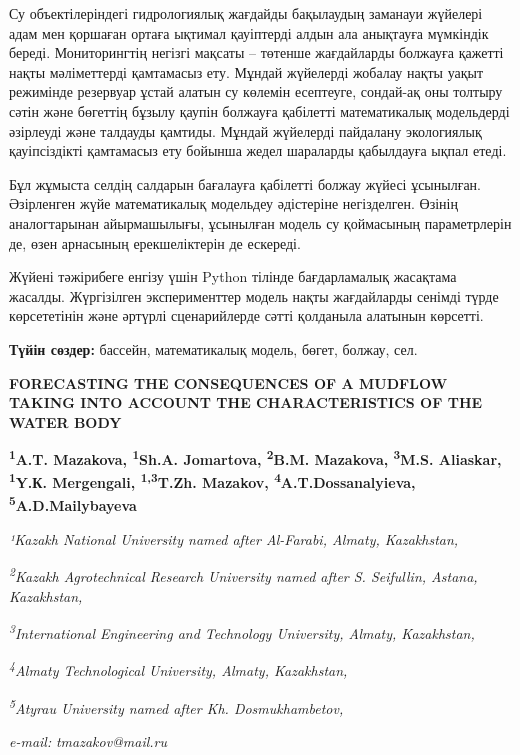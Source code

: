 Су объектілеріндегі гидрологиялық жағдайды бақылаудың заманауи жүйелері
адам мен қоршаған ортаға ықтимал қауіптерді алдын ала анықтауға
мүмкіндік береді. Мониторингтің негізгі мақсаты -- төтенше жағдайларды
болжауға қажетті нақты мәліметтерді қамтамасыз ету. Мұндай жүйелерді
жобалау нақты уақыт режимінде резервуар ұстай алатын су көлемін
есептеуге, сондай-ақ оны толтыру сәтін және бөгеттің бұзылу қаупін
болжауға қабілетті математикалық модельдерді әзірлеуді және талдауды
қамтиды. Мұндай жүйелерді пайдалану экологиялық қауіпсіздікті қамтамасыз
ету бойынша жедел шараларды қабылдауға ықпал етеді.

Бұл жұмыста селдің салдарын бағалауға қабілетті болжау жүйесі ұсынылған.
Әзірленген жүйе математикалық модельдеу әдістеріне негізделген. Өзінің
аналогтарынан айырмашылығы, ұсынылған модель су қоймасының параметрлерін
де, өзен арнасының ерекшеліктерін де ескереді.

Жүйені тәжірибеге енгізу үшін Python тілінде бағдарламалық жасақтама
жасалды. Жүргізілген эксперименттер модель нақты жағдайларды сенімді
түрде көрсететінін және әртүрлі сценарийлерде сәтті қолданыла алатынын
көрсетті.

{\bfseries Түйін сөздер:} бассейн, математикалық модель, бөгет, болжау,
сел.

\begin{articleheader}
{\bfseries FORECASTING THE CONSEQUENCES OF A MUDFLOW TAKING INTO ACCOUNT
THE CHARACTERISTICS OF THE WATER BODY}

{\bfseries \textsuperscript{1}A.T. Mazakova,
\textsuperscript{1}Sh.A. Jomartova,
\textsuperscript{2}B.M. Mazakova,
\textsuperscript{3}M.S. Aliaskar,
\textsuperscript{1}Y.К. Mergengali,
\textsuperscript{1,3}T.Zh. Mazakov\textsuperscript{\envelope },
\textsuperscript{4}A.T.Dossanalyieva,
\textsuperscript{5}A.D.Mailybayeva}
\end{articleheader}

\begin{affiliation}
\emph{¹Kazakh National University named after Al-Farabi, Almaty, Kazakhstan,}

\emph{\textsuperscript{2}Kazakh Agrotechnical Research University named after S. Seifullin, Astana, Kazakhstan,}

\emph{\textsuperscript{3}International Engineering and Technology University, Almaty, Kazakhstan,}

\emph{\textsuperscript{4}Almaty Technological University, Almaty, Kazakhstan,}

\emph{\textsuperscript{5}Atyrau University named after Kh. Dosmukhambetov,}

\emph{e-mail:} \emph{tmazakov@mail.ru}
\end{affiliation}

